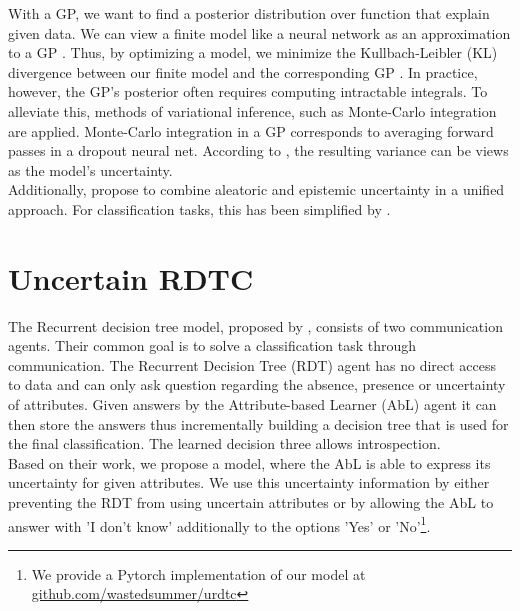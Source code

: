 \documentclass[a4paper,cleardoubleempty,BCOR1cm, 11pt]{report}
\begin{document}
With a GP, we want to find a posterior distribution over function that explain given data. We can view a finite model like a neural network as an approximation to a GP \cite{damianou2013deep}. Thus, by optimizing a model, we minimize the Kullbach-Leibler (KL) divergence between our finite model and the corresponding GP \cite{gal2016dropout}. In practice, however, the GP's posterior often requires computing intractable integrals. To alleviate this, methods of variational inference, such as Monte-Carlo integration are applied. Monte-Carlo integration in a GP corresponds to averaging forward passes in a dropout neural net. According to \citet{gal2016dropout}, the resulting variance can be views as the model's uncertainty.
\\
Additionally, \citet{kendall2017uncertainties} propose to combine aleatoric and epistemic uncertainty in a unified approach. For classification tasks, this has been simplified by \citet{kwon2020uncertainty}.







\chapter{Uncertain RDTC} %
The Recurrent decision tree model, proposed by \citet{alaniz2019explainable}, consists of two communication agents. Their common goal is to solve a classification task through communication. The Recurrent Decision Tree (RDT) agent has no direct access to data and can only ask question regarding the absence, presence or uncertainty of attributes. Given answers by the Attribute-based Learner (AbL) agent it can then store the answers thus incrementally building a decision tree that is used for the final classification. The learned decision three allows introspection.\\
Based on their work, we propose a model, where the AbL is able to express its uncertainty for given attributes. We use this uncertainty information by either preventing the RDT from using uncertain attributes or by allowing the AbL to answer with 'I don't know' additionally to the options 'Yes' or 'No'\footnote{We provide a Pytorch implementation of our model at \url{github.com/wastedsummer/urdtc}}. 
\end{document}

